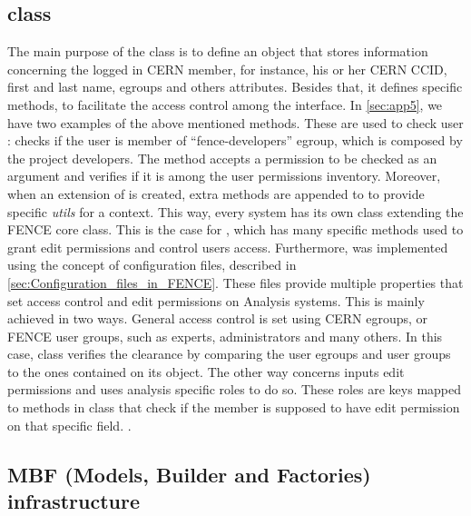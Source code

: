 \subsection{ class}%
\label{sec:User_class}

The main purpose of the  class is to define an object that stores information concerning the logged in CERN member, for instance, his or her CERN CCID, first and last name, egroups and others attributes. Besides that, it defines specific methods, to facilitate the access control among the interface.
In \cref{sec:app5}, we have two examples of the above mentioned methods. These are used to check user :  checks if the user is member of \enquote{fence-developers} egroup, which is composed by the project developers. %
The method  accepts a permission to be checked as an argument and verifies if it is among the user permissions inventory. %
Moreover, when an extension of  is created, extra methods are appended to  to provide specific \textit{utils} for a context.
This way, every system has its own  class extending the FENCE core  class.
This is the case for , which has many specific methods used to grant edit permissions and control users access.
Furthermore,  was implemented using the concept of configuration files, described in \cref{sec:Configuration_files_in_FENCE}.
These files provide multiple properties that set access control and edit permissions on Analysis systems. This is mainly achieved in two ways. General access control is set using CERN egroups, or FENCE user groups, such as experts, administrators and many others.
In this case,  class verifies the clearance by comparing the user egroups and user groups to the ones contained on its object.
The other way concerns inputs edit permissions and uses analysis specific roles to do so.
These roles are keys mapped to methods in  class that check if the member is supposed to have edit permission on that specific field.
.


\subsection{MBF (Models, Builder and Factories) infrastructure}%
\label{sec:MBF_Models_Builder_and_Factories_infrastructure}

